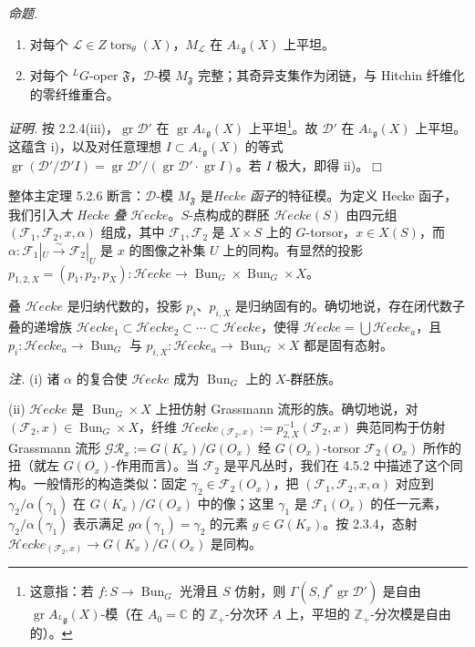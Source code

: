  \emph{命题.}
\begin{enumerate}[label=(\roman*),leftmargin=2.2em]
\item 对每个 $\mathcal{L}\in Z\operatorname{tors}_\theta(X)$，$M_{\mathcal{L}}$ 在 $A_{{}^{L}\mathfrak{g}}(X)$ 上平坦。
\item 对每个 ${}^{L}G$-oper $\mathfrak{F}$，$\mathcal{D}$-模 $M_{\mathfrak{F}}$ 完整；其奇异支集作为闭链，与 Hitchin 纤维化的零纤维重合。
\end{enumerate}

\emph{证明.} 按 2.2.4(iii)，$\operatorname{gr}\mathcal{D}'$ 在 $\operatorname{gr}A_{{}^{L}\mathfrak{g}}(X)$ 上平坦\footnote{这意指：若 $f:S\to\operatorname{Bun}_G$ 光滑且 $S$ 仿射，则 $\Gamma(S,f^*\operatorname{gr}\mathcal{D}')$ 是自由 $\operatorname{gr}A_{{}^{L}\mathfrak{g}}(X)$-模（在 $A_0=\mathbb{C}$ 的 $\mathbb{Z}_+$-分次环 $A$ 上，平坦的 $\mathbb{Z}_+$-分次模是自由的）。}。故 $\mathcal{D}'$ 在 $A_{{}^{L}\mathfrak{g}}(X)$ 上平坦。这蕴含 i)，以及对任意理想 $I\subset A_{{}^{L}\mathfrak{g}}(X)$ 的等式 $\operatorname{gr}(\mathcal{D}'/\mathcal{D}'I)=\operatorname{gr}\mathcal{D}'/(\operatorname{gr}\mathcal{D}'\cdot\operatorname{gr}I)$。若 $I$ 极大，即得 ii)。\hfill$\Box$



 整体主定理 5.2.6 断言：$\mathcal{D}$-模 $M_{\mathfrak{F}}$ 是\emph{Hecke 函子}的特征模。为定义 Hecke 函子，我们引入\emph{大 Hecke 叠} $\mathcal{H}ecke$。$S$-点构成的群胚 $\mathcal{H}ecke(S)$ 由四元组 $(\mathcal{F}_1,\mathcal{F}_2,x,\alpha)$ 组成，其中 $\mathcal{F}_1,\mathcal{F}_2$ 是 $X\times S$ 上的 $G$-torsor，$x\in X(S)$，而 $\alpha:\mathcal{F}_1|_U\xrightarrow{\sim}\mathcal{F}_2|_U$ 是 $x$ 的图像之补集 $U$ 上的同构。有显然的投影 $p_{1,2,X}=(p_1,p_2,p_X):\mathcal{H}ecke\to\operatorname{Bun}_G\times\operatorname{Bun}_G\times X$。

叠 $\mathcal{H}ecke$ 是归纳代数的，投影 $p_i$、$p_{i,X}$ 是归纳固有的。确切地说，存在闭代数子叠的递增族 $\mathcal{H}ecke_1\subset\mathcal{H}ecke_2\subset\cdots\subset\mathcal{H}ecke$，使得 $\mathcal{H}ecke=\bigcup\mathcal{H}ecke_a$，且 $p_i:\mathcal{H}ecke_a\to\operatorname{Bun}_G$ 与 $p_{i,X}:\mathcal{H}ecke_a\to\operatorname{Bun}_G\times X$ 都是固有态射。

 \emph{注.} (i) 诸 $\alpha$ 的复合使 $\mathcal{H}ecke$ 成为 $\operatorname{Bun}_G$ 上的 $X$-群胚族。

(ii) $\mathcal{H}ecke$ 是 $\operatorname{Bun}_G\times X$ 上扭仿射 Grassmann 流形的族。确切地说，对 $(\mathcal{F}_2,x)\in\operatorname{Bun}_G\times X$，纤维 $\mathcal{H}ecke_{(\mathcal{F}_2,x)}:=p_{2,X}^{-1}(\mathcal{F}_2,x)$ 典范同构于仿射 Grassmann 流形 $\mathcal{GR}_x:=G(K_x)/G(O_x)$ 经 $G(O_x)$-torsor $\mathcal{F}_2(O_x)$ 所作的扭（就左 $G(O_x)$-作用而言）。当 $\mathcal{F}_2$ 是平凡丛时，我们在 4.5.2 中描述了这个同构。一般情形的构造类似：固定 $\gamma_2\in\mathcal{F}_2(O_x)$，把 $(\mathcal{F}_1,\mathcal{F}_2,x,\alpha)$ 对应到 $\gamma_2/\alpha(\gamma_1)$ 在 $G(K_x)/G(O_x)$ 中的像；这里 $\gamma_1$ 是 $\mathcal{F}_1(O_x)$ 的任一元素，$\gamma_2/\alpha(\gamma_1)$ 表示满足 $g\alpha(\gamma_1)=\gamma_2$ 的元素 $g\in G(K_x)$。按 2.3.4，态射 $\mathcal{H}ecke_{(\mathcal{F}_2,x)}\to G(K_x)/G(O_x)$ 是同构。

